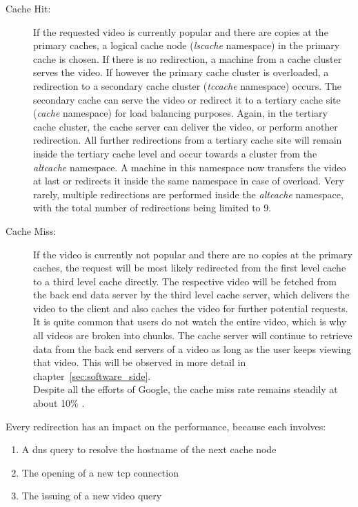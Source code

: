 \begin{description}
\item[Cache Hit:] If the requested video is currently popular and there are copies at the primary caches, a logical cache node (\emph{lscache} namespace) in the primary cache is chosen. If there is no redirection, a machine from a cache cluster serves the video. If however the primary cache cluster is overloaded, a redirection to a secondary cache cluster (\emph{tccache} namespace) occurs. The secondary cache can serve the video or redirect it to a tertiary cache site (\emph{cache} namespace) for load balancing purposes. Again, in the tertiary cache cluster, the cache server can deliver the video, or perform another redirection. All further redirections from a tertiary cache site will remain inside the tertiary cache level and occur towards a cluster from the \emph{altcache} namespace. A machine in this namespace now transfers the video at last or redirects it inside the same namespace in case of overload. Very rarely, multiple redirections are performed inside the \emph{altcache} namespace, with the total number of redirections being limited to 9. 

\item[Cache Miss:] If the video is currently not popular and there are no copies at the primary caches, the request will be most likely redirected from the first level cache to a third level cache directly. The respective video will be fetched from the back end data server by the third level cache server, which delivers the video to the client and also caches the video for further potential requests. It is quite common that users do not watch the entire video, which is why all videos are broken into chunks. The cache server will continue to retrieve data from the back end servers of a video as long as the user keeps viewing that video. This will be observed in more detail in chapter~\ref{sec:software_side}. \\
  Despite all the efforts of Google, the cache miss rate remains steadily at about 10\% \cite{inc:video_delivery}.
\end{description}

Every redirection has an impact on the performance, because each involves:

\begin{enumerate}
  \item A \gls{dns} query to resolve the hostname of the next cache node
  \item The opening of a new \gls{tcp} connection
  \item The issuing of a new video query
\end{enumerate}

